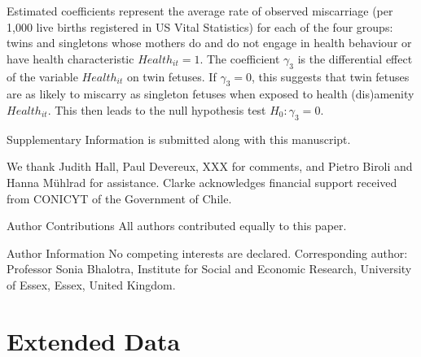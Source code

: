 \documentclass{nature}
\begin{document}
\begin{linenumbers}
Estimated coefficients represent the average rate of observed miscarriage (per 1,000 live births registered in US Vital Statistics) for each of the four groups: twins and singletons whose mothers do and do not engage in health behaviour or have health characteristic $Health_{it}=1$. The coefficient $\gamma_3$ is the differential effect of the variable $Health_{it}$ on twin fetuses.  If $\gamma_3=0$, this suggests that twin fetuses are as likely to miscarry as singleton fetuses when exposed to health (dis)amenity $Health_{it}$.  This then leads to the null hypothesis test $H_0: \gamma_3=0$.




\clearpage



\clearpage
\begin{addendum}
 \item[Supplementary Information] is submitted along with this manuscript.
 \item We thank Judith Hall, Paul Devereux, XXX for comments, and Pietro Biroli and Hanna M\"uhlrad for assistance.  Clarke acknowledges financial support received from CONICYT of the Government of Chile.
 \item[Author Contributions] All authors contributed equally to this paper.
 \item[Author Information] No competing interests are declared.  Corresponding author: Professor Sonia Bhalotra, Institute for Social and Economic Research, University of Essex, Essex, United Kingdom.
\end{addendum}

\clearpage
\section{Extended Data}
\setcounter{figure}{1}
\setcounter{table}{1}
\renewcommand{\tablename}{Extended Data Table}
\renewcommand{\figurename}{Extended Data Figure}


\end{linenumbers}
\end{document}
